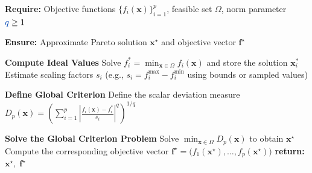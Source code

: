 \documentclass[11pt,pdflatex,sn-mathphys-ay]{sn-jnl}%
\theoremstyle{definition}
\theoremstyle{thmstyleone}%
\theoremstyle{thmstyletwo}%
\theoremstyle{thmstylethree}%
\newcommand{\add}[1]{\textcolor{revisionblue}{#1}}
\begin{document}
\begin{appendices}
		\begin{algorithm}[H]
			\caption{Global Criterion Method (GCM) Based on Ideal Point Deviation}
			\label{alg:gcm}
			\begin{algorithmic}[1]
				\item[] \hspace{-2em} \textbf{Require:} Objective functions $\{f_i(\bm{x})\}_{i=1}^p$, feasible set $\Omega$, norm parameter $\add{q} \ge 1$
				\item[] \hspace{-2em} \textbf{Ensure:} Approximate Pareto solution $\bm{x}^{\star}$ and objective vector $\bm{f}^{\star}$
				\item[] \hspace{-1.6em} \textbf{Compute Ideal Values}    
				\STATE Solve
				$f_i^* = \min_{\bm{x} \in \Omega} f_i(\bm{x})$
				and store the solution $\bm{x}_i^*$
				\ENDFOR
				\STATE Estimate scaling factors $s_i$ (e.g., $s_i = f_i^{\max} - f_i^{\min}$ using bounds or sampled values)
				\item[] \hspace{-1.6em} \textbf{Define Global Criterion}
				\STATE Define the scalar deviation measure
				$D_p(\bm{x}) = 
				\left( 
				\sum_{i=1}^{p} 
				\left| 
				\frac{f_i(\bm{x}) - f_i^*}{s_i} 
				\right|^q 
				\right)^{1/q}$
				\item[] \hspace{-1.6em} \textbf{Solve the Global Criterion Problem}
				\STATE Solve
				$\min_{\bm{x} \in \Omega} D_p(\bm{x})$
				to obtain $\bm{x}^{\star}$
				\STATE Compute the corresponding objective vector
				$\bm{f}^{\star} = \bigl(f_1(\bm{x}^{\star}),\dots,f_p(\bm{x}^{\star})\bigr)$
				\STATE \textbf{return:} $\bm{x}^{\star},\; \bm{f}^{\star}$
			\end{algorithmic}
		\end{algorithm}

\end{appendices}
\end{document}

